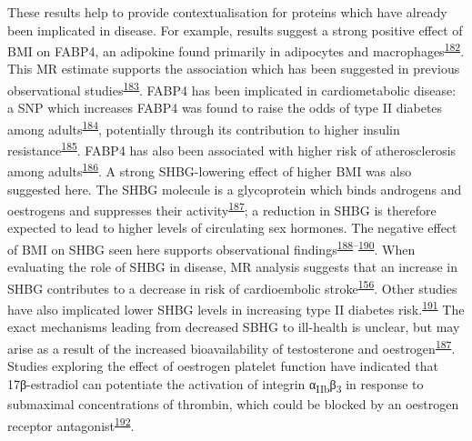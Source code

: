 \documentclass[11pt,twoside]{bristolthesis}
\begin{document}
These results help to provide contextualisation for proteins which have already been implicated in disease. For example, results suggest a strong positive effect of BMI on FABP4, an adipokine found primarily in adipocytes and macrophages\textsuperscript{\protect\hyperlink{ref-Furuhashi2014}{182}}. This MR estimate supports the association which has been suggested in previous observational studies\textsuperscript{\protect\hyperlink{ref-Xu2006}{183}}. FABP4 has been implicated in cardiometabolic disease: a SNP which increases FABP4 was found to raise the odds of type II diabetes among adults\textsuperscript{\protect\hyperlink{ref-Gudmundsdottir2020}{184}}, potentially through its contribution to higher insulin resistance\textsuperscript{\protect\hyperlink{ref-Nakamura2017}{185}}. FABP4 has also been associated with higher risk of atherosclerosis among adults\textsuperscript{\protect\hyperlink{ref-Yeung2007}{186}}. A strong SHBG-lowering effect of higher BMI was also suggested here. The SHBG molecule is a glycoprotein which binds androgens and oestrogens and suppresses their activity\textsuperscript{\protect\hyperlink{ref-Wallace2013}{187}}; a reduction in SHBG is therefore expected to lead to higher levels of circulating sex hormones. The negative effect of BMI on SHBG seen here supports observational findings\textsuperscript{\protect\hyperlink{ref-Cooper2015}{188}--\protect\hyperlink{ref-Baglietto2009}{190}}. When evaluating the role of SHBG in disease, MR analysis suggests that an increase in SHBG contributes to a decrease in risk of cardioembolic stroke\textsuperscript{\protect\hyperlink{ref-Zheng2020}{156}}. Other studies have also implicated lower SHBG levels in increasing type II diabetes risk.\textsuperscript{\protect\hyperlink{ref-Ritchie2019}{191}} The exact mechanisms leading from decreased SBHG to ill-health is unclear, but may arise as a result of the increased bioavailability of testosterone and oestrogen\textsuperscript{\protect\hyperlink{ref-Wallace2013}{187}}. Studies exploring the effect of oestrogen platelet function have indicated that 17β-estradiol can potentiate the activation of integrin α\textsubscript{IIb}β\textsubscript{3} in response to submaximal concentrations of thrombin, which could be blocked by an oestrogen receptor antagonist\textsuperscript{\protect\hyperlink{ref-Moro2005}{192}}.
\end{document}
